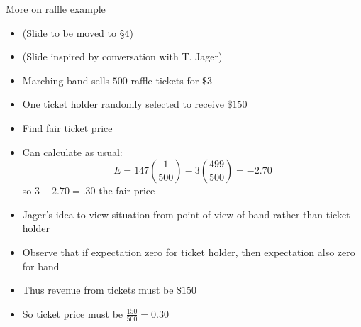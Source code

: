 \documentclass[handout]{beamer}
\theoremstyle{definition}
\begin{document}
\begin{frame}{More on raffle example}
\begin{itemize}
\item (Slide to be moved to \S4)
\item (Slide inspired by conversation with T. Jager)
\item Marching band sells $500$ raffle tickets for $\$3$
\item One ticket holder randomly selected to receive $\$150$
\item Find fair ticket price
\item Can calculate as usual:
\[E=147\left(\frac{1}{500}\right)-3\left(\frac{499}{500}\right)=-2.70\]
so $3-2.70=.30$ the fair price
\item Jager's idea to view situation from point of view
of band rather than ticket holder
\item Observe that if expectation zero for ticket holder,
then expectation also zero for band
\item Thus revenue from tickets must be $\$150$
\item So ticket price must be $\frac{150}{500}=0.30$
\end{itemize}
\end{frame}
\end{document}
